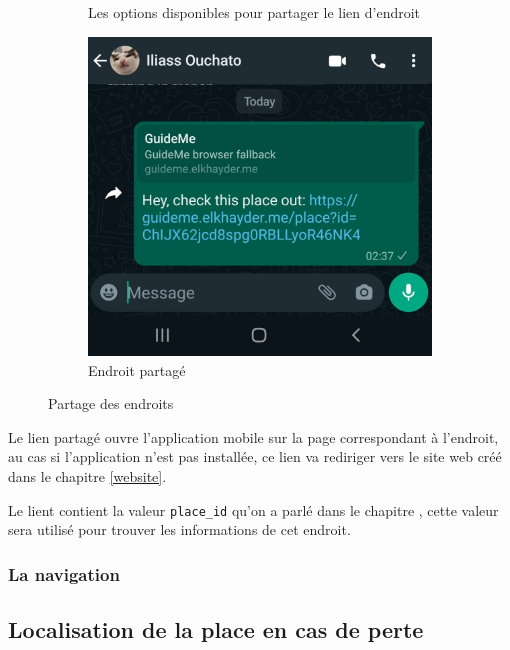 \begin{figure}[!htbp]
\begin{subfigure}[t]{.45\linewidth}
        \caption{Les options disponibles pour partager le lien d'endroit}
    \end{subfigure}
    \hfill
    \begin{subfigure}[t]{.45\linewidth}
        \centering
         \includegraphics[width=\textwidth]{assets/app/share/shared.jpg}
         \caption{Endroit partagé}
    \end{subfigure}
    \caption{Partage des endroits}
\end{figure}

\FloatBarrier

Le lien partagé ouvre l'application mobile sur la page correspondant à l'endroit, au cas si l'application n'est pas installée, ce lien va rediriger vers le site web créé dans le chapitre \ref{website}.

Le lient contient la valeur \verb|place_id| qu'on a parlé dans le chapitre , cette valeur sera utilisé pour trouver les informations de cet endroit.

\subsubsection{La navigation}

\subsection{Localisation de la place en cas de perte}

